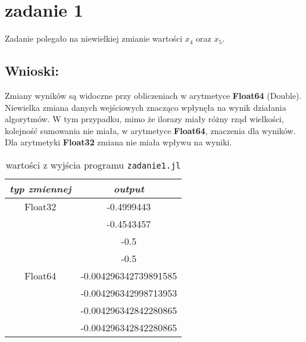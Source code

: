 \section{zadanie 1}
Zadanie polegało na niewielkiej zmianie wartości \(x_4\) oraz \(x_5\).

\subsection{Wnioski:}
Zmiany wyników są widoczne przy obliczeniach w arytmetyce \textbf{Float64} (Double). Niewielka zmiana danych wejściowych znacząco wpłynęła na wynik działania algorytmów. W tym przypadku, mimo że ilorazy miały różny rząd wielkości, kolejność sumowania nie miała, w arytmetyce \textbf{Float64}, znaczenia dla wyników. Dla arytmetyki \textbf{Float32} zmiana nie miała wpływu na wyniki.

\begin{table}[ht]
  \centering
  \begin{tabular}{|c|c|}
    \hline
    \emph{typ zmiennej} & \emph{output} \\
    \hline
    \hline
    Float32 & -0.4999443 \\
     & -0.4543457 \\
     & -0.5 \\
     & -0.5 \\
    Float64 & -0.004296342739891585 \\
     & -0.004296342998713953 \\
     & -0.004296342842280865 \\
     & -0.004296342842280865 \\
    \hline
  \end{tabular}
  \caption{wartości z wyjścia programu \texttt{zadanie1.jl}}
\end{table}